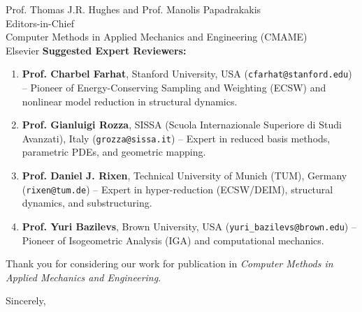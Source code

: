\documentclass[11pt]{letter}
\begin{document}
\begin{letter}{Prof. Thomas J.R. Hughes and Prof. Manolis Papadrakakis\\Editors-in-Chief\\Computer Methods in Applied Mechanics and Engineering (CMAME)\\Elsevier}
\vspace{0.5em}
\noindent\textbf{Suggested Expert Reviewers:}
\begin{enumerate}
    \item \textbf{Prof. Charbel Farhat}, Stanford University, USA (\texttt{cfarhat@stanford.edu}) -- Pioneer of Energy-Conserving Sampling and Weighting (ECSW) and nonlinear model reduction in structural dynamics.
    \item \textbf{Prof. Gianluigi Rozza}, SISSA (Scuola Internazionale Superiore di Studi Avanzati), Italy (\texttt{grozza@sissa.it}) -- Expert in reduced basis methods, parametric PDEs, and geometric mapping.
    \item \textbf{Prof. Daniel J. Rixen}, Technical University of Munich (TUM), Germany (\texttt{rixen@tum.de}) -- Expert in hyper-reduction (ECSW/DEIM), structural dynamics, and substructuring.
    \item \textbf{Prof. Yuri Bazilevs}, Brown University, USA (\texttt{yuri\_bazilevs@brown.edu}) -- Pioneer of Isogeometric Analysis (IGA) and computational mechanics.
\end{enumerate}

Thank you for considering our work for publication in \textit{Computer Methods in Applied Mechanics and Engineering}.

\closing{Sincerely,}

\end{letter}
\end{document}
